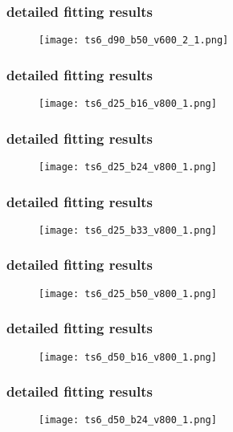 	\begin{frame}
		\frametitle{\appendixname{} \textendash{} detailed fitting results}
		\begin{figure}
			\texttt{[image: ts6\_d90\_b50\_v600\_2\_1.png]}
		\end{figure}
	\end{frame}

	\begin{frame}
		\frametitle{\appendixname{} \textendash{} detailed fitting results}\label{app:details:ts6v800}
		\begin{figure}
			\texttt{[image: ts6\_d25\_b16\_v800\_1.png]}
		\end{figure}
	\end{frame}

	\begin{frame}
		\frametitle{\appendixname{} \textendash{} detailed fitting results}
		\begin{figure}
			\texttt{[image: ts6\_d25\_b24\_v800\_1.png]}
		\end{figure}
	\end{frame}

	\begin{frame}
		\frametitle{\appendixname{} \textendash{} detailed fitting results}
		\begin{figure}
			\texttt{[image: ts6\_d25\_b33\_v800\_1.png]}
		\end{figure}
	\end{frame}

	\begin{frame}
		\frametitle{\appendixname{} \textendash{} detailed fitting results}
		\begin{figure}
			\texttt{[image: ts6\_d25\_b50\_v800\_1.png]}
		\end{figure}
	\end{frame}

	\begin{frame}
		\frametitle{\appendixname{} \textendash{} detailed fitting results}
		\begin{figure}
			\texttt{[image: ts6\_d50\_b16\_v800\_1.png]}
		\end{figure}
	\end{frame}

	\begin{frame}
		\frametitle{\appendixname{} \textendash{} detailed fitting results}
		\begin{figure}
			\texttt{[image: ts6\_d50\_b24\_v800\_1.png]}
		\end{figure}
	\end{frame}

